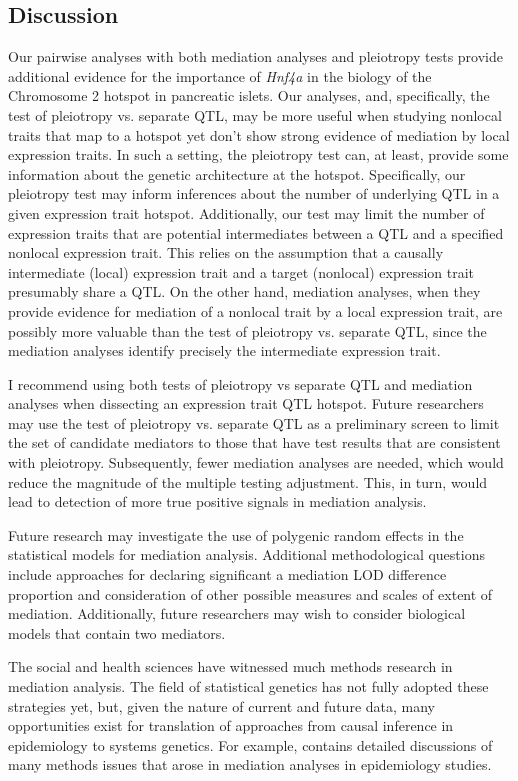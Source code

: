 \documentclass[oneside]{book}\usepackage[]{graphicx}\usepackage[]{color}
\begin{document}
\begin{titlepage}
\subsection{Discussion}

Our pairwise analyses with both mediation analyses and pleiotropy tests provide additional
evidence for the importance of \emph{Hnf4a} in the biology of the Chromosome 2 hotspot
in pancreatic islets.
Our analyses, and, specifically, the test of pleiotropy vs. separate QTL, may be more useful
when studying nonlocal traits that map to a hotspot yet don't show strong evidence
of mediation by local expression traits.
In such a setting, the pleiotropy test can, at least, provide some information about
the genetic architecture at the hotspot.
Specifically, our pleiotropy test may inform inferences about the number of
underlying QTL in a given expression trait hotspot.
Additionally, our test may limit the number of expression traits that are
potential intermediates between a QTL and a specified nonlocal expression trait.
This relies on the assumption that a causally intermediate (local) expression trait and a
target (nonlocal) expression trait presumably share a QTL. On the other hand, mediation analyses, when they provide evidence for mediation of a nonlocal
trait by a local expression trait, are possibly more valuable than the test of pleiotropy vs.
separate QTL, since the mediation analyses identify precisely the intermediate expression trait.

I recommend using both tests of pleiotropy vs separate QTL and mediation analyses when
dissecting an expression trait QTL hotspot.
Future researchers may use the test of pleiotropy vs. separate QTL as a
preliminary screen to limit the set of candidate mediators to those that have
test results that are consistent with pleiotropy. Subsequently, fewer mediation
analyses are needed, which would reduce the magnitude of the multiple testing
adjustment. This, in turn, would lead to detection of more true positive signals
in mediation analysis.

Future research may investigate the use of polygenic random effects in the statistical models
for mediation analysis. Additional methodological questions include approaches for declaring
significant a mediation LOD difference proportion and consideration of other possible measures
and scales of extent of mediation. Additionally, future researchers may wish to consider
biological models that contain two mediators.

The social and health sciences have witnessed much methods research in mediation analysis.
The field of statistical genetics has not fully adopted these strategies yet, but, given the
nature of current and future data, many opportunities exist for translation of approaches from
causal inference in epidemiology to systems genetics.
For example, \citet{vanderweele2015explanation} contains detailed discussions of many methods
issues that arose in mediation analyses in
epidemiology studies.





\end{titlepage}
\end{document}
